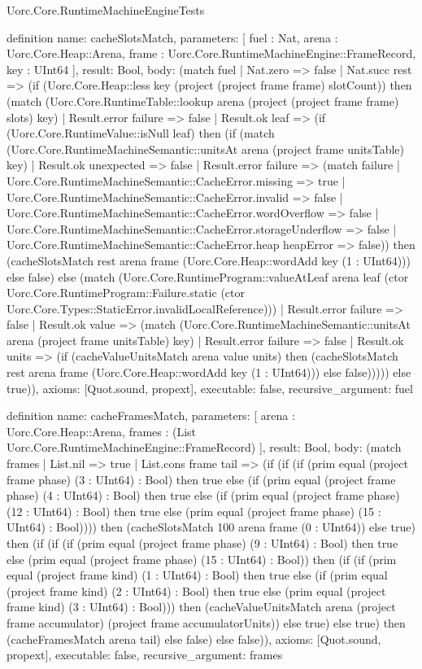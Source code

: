 \begin{lexlean}{Uorc.Core.RuntimeMachineEngineTests}
\begin{semanticmodule}
definition{
  name: cacheSlotsMatch,
  parameters: [
    fuel : Nat,
    arena : Uorc.Core.Heap::Arena,
    frame : Uorc.Core.RuntimeMachineEngine::FrameRecord,
    key : UInt64
  ],
  result: Bool,
  body: (match fuel
    | Nat.zero => false
    | Nat.succ rest => (if (Uorc.Core.Heap::less key (project (project frame frame) slotCount)) then (match (Uorc.Core.RuntimeTable::lookup arena (project (project frame frame) slots) key)
      | Result.error failure => false
      | Result.ok leaf => (if (Uorc.Core.RuntimeValue::isNull leaf) then (if (match (Uorc.Core.RuntimeMachineSemantic::unitsAt arena (project frame unitsTable) key)
        | Result.ok unexpected => false
        | Result.error failure => (match failure
          | Uorc.Core.RuntimeMachineSemantic::CacheError.missing => true
          | Uorc.Core.RuntimeMachineSemantic::CacheError.invalid => false
          | Uorc.Core.RuntimeMachineSemantic::CacheError.wordOverflow => false
          | Uorc.Core.RuntimeMachineSemantic::CacheError.storageUnderflow => false
          | Uorc.Core.RuntimeMachineSemantic::CacheError.heap heapError => false)) then (cacheSlotsMatch rest arena frame (Uorc.Core.Heap::wordAdd key (1 : UInt64))) else false) else (match (Uorc.Core.RuntimeProgram::valueAtLeaf arena leaf (ctor Uorc.Core.RuntimeProgram::Failure.static (ctor Uorc.Core.Types::StaticError.invalidLocalReference)))
        | Result.error failure => false
        | Result.ok value => (match (Uorc.Core.RuntimeMachineSemantic::unitsAt arena (project frame unitsTable) key)
          | Result.error failure => false
          | Result.ok units => (if (cacheValueUnitsMatch arena value units) then (cacheSlotsMatch rest arena frame (Uorc.Core.Heap::wordAdd key (1 : UInt64))) else false))))) else true)),
  axioms: [Quot.sound, propext],
  executable: false,
  recursive_argument: fuel
}

definition{
  name: cacheFramesMatch,
  parameters: [
    arena : Uorc.Core.Heap::Arena,
    frames : (List Uorc.Core.RuntimeMachineEngine::FrameRecord)
  ],
  result: Bool,
  body: (match frames
    | List.nil => true
    | List.cons frame tail => (if (if (if (prim equal (project frame phase) (3 : UInt64) : Bool) then true else (if (prim equal (project frame phase) (4 : UInt64) : Bool) then true else (if (prim equal (project frame phase) (12 : UInt64) : Bool) then true else (prim equal (project frame phase) (15 : UInt64) : Bool)))) then (cacheSlotsMatch 100 arena frame (0 : UInt64)) else true) then (if (if (if (prim equal (project frame phase) (9 : UInt64) : Bool) then true else (prim equal (project frame phase) (15 : UInt64) : Bool)) then (if (if (prim equal (project frame kind) (1 : UInt64) : Bool) then true else (if (prim equal (project frame kind) (2 : UInt64) : Bool) then true else (prim equal (project frame kind) (3 : UInt64) : Bool))) then (cacheValueUnitsMatch arena (project frame accumulator) (project frame accumulatorUnits)) else true) else true) then (cacheFramesMatch arena tail) else false) else false)),
  axioms: [Quot.sound, propext],
  executable: false,
  recursive_argument: frames
}


\end{semanticmodule}
\end{lexlean}
